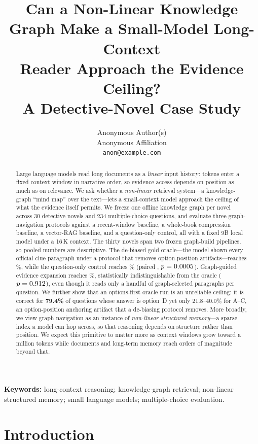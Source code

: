\documentclass{article}
\title{Can a Non-Linear Knowledge Graph Make a Small-Model Long-Context\\
Reader Approach the Evidence Ceiling?\\
A Detective-Novel Case Study}
\author{Anonymous Author(s) \\
  Anonymous Affiliation \\
  \texttt{anon@example.com}}
\begin{document}
\maketitle

\begin{abstract}
Large language models read long documents as a \emph{linear} input history: tokens
enter a fixed context window in narrative order, so evidence access depends on
position as much as on relevance. We ask whether a \emph{non-linear} retrieval
system---a knowledge-graph ``mind map'' over the text---lets a small-context model
approach the ceiling of what the evidence itself permits. We freeze one offline
knowledge graph per novel across 30 detective novels and 234 multiple-choice
questions, and evaluate three graph-navigation protocols against a recent-window
baseline, a whole-book compression baseline, a vector-RAG baseline, and a
question-only control, all with a fixed 9B local model under a 16\,K context.
The thirty novels span two frozen graph-build pipelines, so pooled numbers are
descriptive. The de-biased gold oracle---the model shown every official clue
paragraph under a
protocol that removes option-position artifacts---reaches \GoldCeilingAcc\%,
while the question-only control reaches \QZeroAcc\%
(paired \GoldVsTerseDelta{}, $p=0.0005$). Graph-guided evidence expansion
reaches \GraphExpansionAcc\%, statistically indistinguishable from the oracle
($p=0.912{}$), even though it reads only a handful of graph-selected
paragraphs per question. We further show that an options-first oracle run is an
unreliable
ceiling: it is correct for \textbf{79.4\%} of questions whose answer is option~D
yet only 21.8--40.0\% for A--C, an option-position anchoring artifact that a
de-biasing protocol removes. More broadly, we view graph navigation as an
instance of \emph{non-linear structured memory}---a sparse index a model can hop
across, so that reasoning depends on structure rather than position. We expect
this primitive to matter more as context windows grow toward a million tokens
while documents and long-term memory reach orders of magnitude beyond that.
\end{abstract}

\textbf{Keywords:} long-context reasoning; knowledge-graph retrieval; non-linear
structured memory; small language models; multiple-choice evaluation.

\section{Introduction}
\label{sec:intro}
\end{document}
